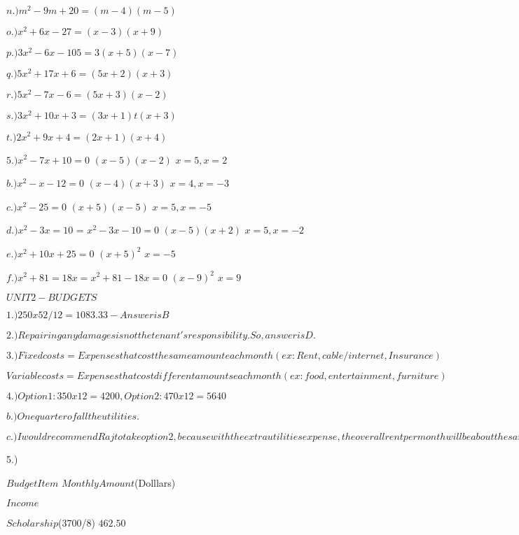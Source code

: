 \documentclass{article}
\begin{document}
$n.)m^2-9m+20=(m-4)(m-5)$

$o.)x^2+6x-27=(x-3)(x+9)$

$p.)3x^2-6x-105=3(x+5)(x-7)$

$q.)5x^2+17x+6=(5x+2)(x+3)$

$r.)5x^2-7x-6=(5x+3)(x-2)$

$s.)3x^2+10x+3=(3x+1)t(x+3)$

$t.)2x^2+9x+4=(2x+1)(x+4)$\newline

$5.)x^2-7x+10=0$
  $(x-5)(x-2)$
  $x=5,x=2$
  
$b.)x^2-x-12=0$
  $(x-4)(x+3)$
  $x=4,x=-3$
  
$c.)x^2-25=0$
  $(x+5)(x-5)$
  $x=5,x=-5$
  
$d.)x^2-3x=10$ = $x^2-3x-10=0$
  $(x-5)(x+2)$
  $x=5,x=-2$
  
$e.)x^2+10x+25=0$
  $(x+5)^2$
  $x=-5$
  
$f.)x^2+81=18x = x^2+81-18x=0$
  $(x-9)^2$
  $x=9$\newline
  
\vspace
$UNIT 2 - BUDGETS$


\vspace
$1.)250x52/12=1083.33-Answer is B$


\vspace
$2.)Repairing any damages is not the tenant's responsibility. So, answer is D.$


\vspace
   $3.)Fixed costs=Expenses that cost the same amount each month(ex:Rent,cable/internet,Insurance)$


\vspace
 $Variable costs=Expenses that cost different amounts each month(ex:food,entertainment,furniture)$
   
  
\vspace
   $4.)Option 1:350x12=4200, Option 2:470x12=5640$
  
\vspace
    $b.)One quarter of all the utilities.$
    
\vspace
    $c.)I would recommend Raj to take option 2, because with the extra utilities expense, the overall rent per month will be about the same as option 2. Plus with  option 2, he does not have to share with three other students.$
    
    
          

5.)

\vspace                     
$Budget Item$                   \hfill$Monthly Amount$(Dolllars)
   

\vspace
 $Income$

\vspace  
 $Scholarship$(3700/8)                                \hfill$462.50$
    
\end{document}
